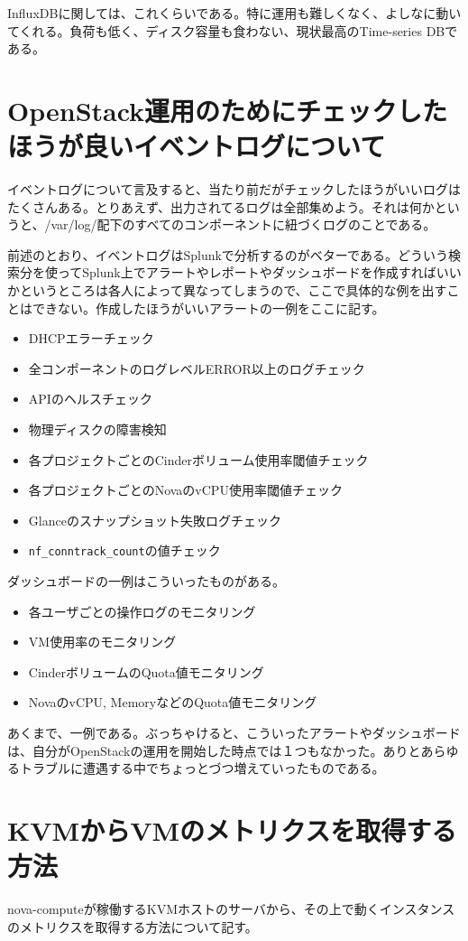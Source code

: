 InfluxDBに関しては、これくらいである。特に運用も難しくなく、よしなに動いてくれる。負荷も低く、ディスク容量も食わない、現状最高のTime-series DBである。

\section{OpenStack運用のためにチェックしたほうが良いイベントログについて}
イベントログについて言及すると、当たり前だがチェックしたほうがいいログはたくさんある。とりあえず、出力されてるログは全部集めよう。それは何かというと、/var/log/配下のすべてのコンポーネントに紐づくログのことである。

前述のとおり、イベントログはSplunkで分析するのがベターである。どういう検索分を使ってSplunk上でアラートやレポートやダッシュボードを作成すればいいかというところは各人によって異なってしまうので、ここで具体的な例を出すことはできない。作成したほうがいいアラートの一例をここに記す。

\begin{itemize}
	\item DHCPエラーチェック
	\item 全コンポーネントのログレベルERROR以上のログチェック
	\item APIのヘルスチェック
	\item 物理ディスクの障害検知
	\item 各プロジェクトごとのCinderボリューム使用率閾値チェック
	\item 各プロジェクトごとのNovaのvCPU使用率閾値チェック
	\item Glanceのスナップショット失敗ログチェック
	\item \verb|nf_conntrack_count|の値チェック
\end{itemize}

ダッシュボードの一例はこういったものがある。

\begin{itemize}
	\item 各ユーザごとの操作ログのモニタリング
	\item VM使用率のモニタリング
	\item CinderボリュームのQuota値モニタリング
	\item NovaのvCPU, MemoryなどのQuota値モニタリング
\end{itemize}

あくまで、一例である。ぶっちゃけると、こういったアラートやダッシュボードは、自分がOpenStackの運用を開始した時点では１つもなかった。ありとあらゆるトラブルに遭遇する中でちょっとづつ増えていったものである。

\section{KVMからVMのメトリクスを取得する方法}
nova-computeが稼働するKVMホストのサーバから、その上で動くインスタンスのメトリクスを取得する方法について記す。
